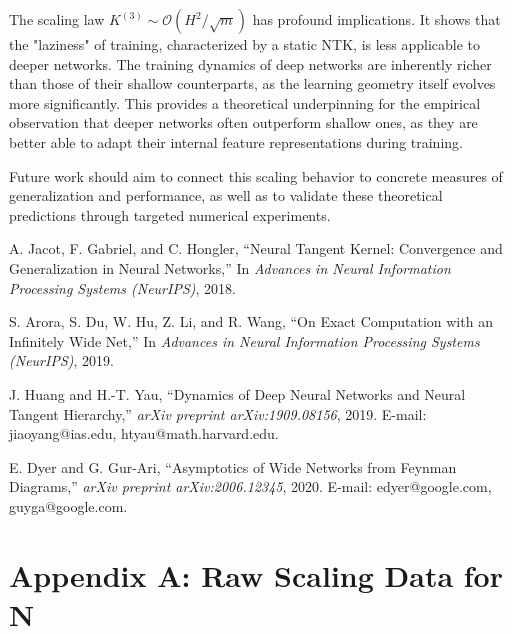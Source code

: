 \documentclass{article}
\newcommand{\Order}{\mathcal{O}}
\begin{document}
The scaling law $K^{(3)} \sim \Order(H^2/\sqrt{m})$ has profound implications. It shows that the "laziness" of training, characterized by a static NTK, is less applicable to deeper networks. The training dynamics of deep networks are inherently richer than those of their shallow counterparts, as the learning geometry itself evolves more significantly. This provides a theoretical underpinning for the empirical observation that deeper networks often outperform shallow ones, as they are better able to adapt their internal feature representations during training.

Future work should aim to connect this scaling behavior to concrete measures of generalization and performance, as well as to validate these theoretical predictions through targeted numerical experiments.

\newpage

\begin{thebibliography}{11}

    A. Jacot, F. Gabriel, and C. Hongler,
    \newblock ``Neural Tangent Kernel: Convergence and Generalization in Neural Networks,''
    \newblock In \emph{Advances in Neural Information Processing Systems (NeurIPS)}, 2018.
    
    S. Arora, S. Du, W. Hu, Z. Li, and R. Wang,
    \newblock ``On Exact Computation with an Infinitely Wide Net,''
    \newblock In \emph{Advances in Neural Information Processing Systems (NeurIPS)}, 2019.
    
    J. Huang and H.-T. Yau,
    \newblock ``Dynamics of Deep Neural Networks and Neural Tangent Hierarchy,''
    \newblock \emph{arXiv preprint arXiv:1909.08156}, 2019.
    \newblock E-mail: jiaoyang@ias.edu, htyau@math.harvard.edu.
    
    E. Dyer and G. Gur-Ari,
    \newblock ``Asymptotics of Wide Networks from Feynman Diagrams,''
    \newblock \emph{arXiv preprint arXiv:2006.12345}, 2020.
    \newblock E-mail: edyer@google.com, guyga@google.com.
    
    \end{thebibliography}

\newpage
\appendix
\section*{Appendix A: Raw Scaling Data for N}
\end{document}
